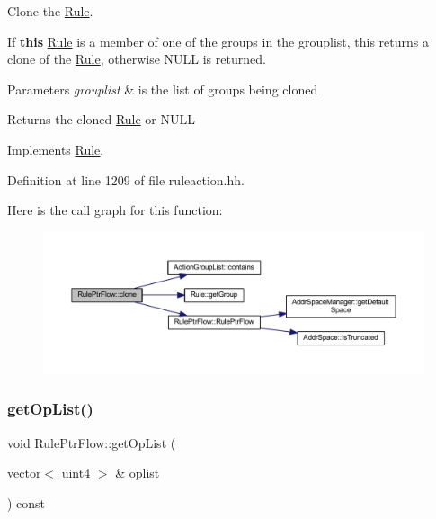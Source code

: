 Clone the \mbox{\hyperlink{class_rule}{Rule}}. 

If {\bfseries{this}} \mbox{\hyperlink{class_rule}{Rule}} is a member of one of the groups in the grouplist, this returns a clone of the \mbox{\hyperlink{class_rule}{Rule}}, otherwise N\+U\+LL is returned. 
\begin{DoxyParams}{Parameters}
{\em grouplist} & is the list of groups being cloned \\
\hline
\end{DoxyParams}
\begin{DoxyReturn}{Returns}
the cloned \mbox{\hyperlink{class_rule}{Rule}} or N\+U\+LL 
\end{DoxyReturn}


Implements \mbox{\hyperlink{class_rule_a70de90a76461bfa7ea0b575ce3c11e4d}{Rule}}.



Definition at line 1209 of file ruleaction.\+hh.

Here is the call graph for this function\+:
\nopagebreak
\begin{figure}[H]
\begin{center}
\leavevmode
\includegraphics[width=350pt]{class_rule_ptr_flow_a8a960fd15c7bf9c4eefbc185523fd3fc_cgraph}
\end{center}
\end{figure}
\mbox{\label{class_rule_ptr_flow_a2e6086b3c89a5e65b711daea5442f90c}} 
\subsubsection{\texorpdfstring{getOpList()}{getOpList()}}
{\footnotesize\ttfamily void Rule\+Ptr\+Flow\+::get\+Op\+List (\begin{DoxyParamCaption}\item[{vector$<$ uint4 $>$ \&}]{oplist }\end{DoxyParamCaption}) const\hspace{0.3cm}{\ttfamily [virtual]}}



